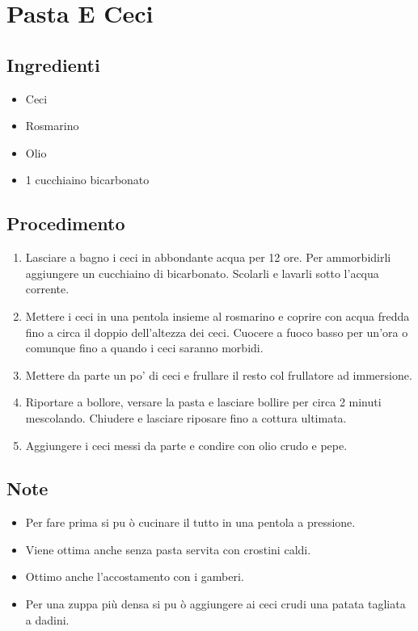 \section{Pasta E Ceci}
\subsection{Ingredienti}
\begin{itemize}
\item Ceci  
\item Rosmarino  
\item Olio  
\item 1 cucchiaino bicarbonato
\end{itemize}
\subsection{Procedimento}
\begin{enumerate}
\item  Lasciare a bagno i ceci in abbondante acqua per 12 ore. Per ammorbidirli aggiungere un cucchiaino di bicarbonato. Scolarli e lavarli sotto l'acqua corrente.  
\item  Mettere i ceci in una pentola insieme al rosmarino e coprire con acqua fredda fino a circa il doppio dell'altezza dei ceci. Cuocere a fuoco basso per un'ora o comunque fino a quando i ceci saranno morbidi.  
\item  Mettere da parte un po' di ceci e frullare il resto col frullatore ad immersione.  
\item  Riportare a bollore, versare la pasta e lasciare bollire per circa 2 minuti mescolando. Chiudere e lasciare riposare fino a cottura ultimata.  
\item  Aggiungere i ceci messi da parte e condire con olio crudo e pepe.
\end{enumerate}
\subsection{Note}
\begin{itemize}
\item Per fare prima si pu ò cucinare il tutto in una pentola a pressione.  
\item Viene ottima anche senza pasta servita con crostini caldi.  
\item Ottimo anche l'accostamento con i gamberi.  
\item Per una zuppa più densa si pu ò aggiungere ai ceci crudi una patata tagliata a dadini.
\end{itemize}
